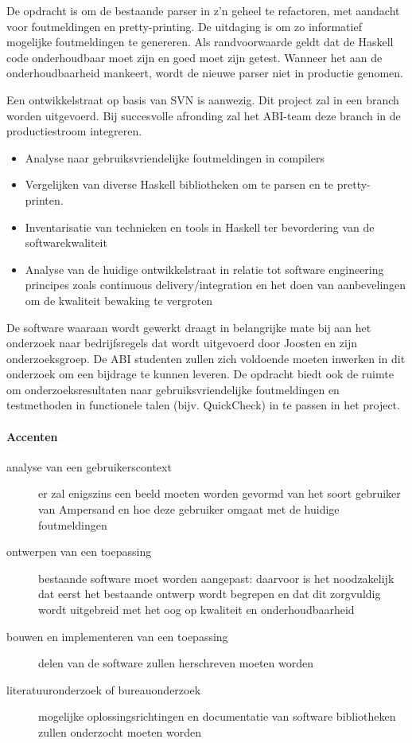 \documentclass[a4paper,12pt,abstracton,titlepage]{scrartcl}
\begin{document}
De opdracht is om de bestaande parser in z’n geheel te refactoren, met aandacht voor foutmeldingen en pretty-printing. De uitdaging is om zo informatief mogelijke foutmeldingen te genereren. Als randvoorwaarde geldt dat de Haskell code onderhoudbaar moet zijn en goed moet zijn getest. Wanneer het aan de onderhoudbaarheid mankeert, wordt de nieuwe parser niet in productie genomen.

Een ontwikkelstraat op basis van SVN is aanwezig. Dit project zal in een branch worden uitgevoerd. Bij succesvolle afronding zal het ABI-team deze branch in de productiestroom integreren.

\begin{itemize}
\item Analyse naar gebruiksvriendelijke foutmeldingen in compilers 
\item Vergelijken van diverse Haskell bibliotheken om te parsen en te pretty-printen. 
\item Inventarisatie van technieken en tools in Haskell ter bevordering van de software\-kwaliteit 
\item Analyse van de huidige ontwikkelstraat in relatie tot software engineering principes zoals continuous delivery/integration en het doen van aanbevelingen om de kwaliteit bewaking te vergroten 
\end{itemize}

De software waaraan wordt gewerkt draagt in belangrijke mate bij aan het onderzoek naar bedrijfsregels dat wordt uitgevoerd door Joosten en zijn onderzoeksgroep. De ABI studenten zullen zich voldoende moeten inwerken in dit onderzoek om een bijdrage te kunnen leveren. De opdracht biedt ook de ruimte om onderzoeksresultaten naar gebruiksvriendelijke foutmeldingen en testmethoden in functionele talen (bijv. QuickCheck) in te passen in het project.

\paragraph{Accenten}
\begin{description}
\item[analyse van een gebruikerscontext] er zal enigszins een beeld moeten worden gevormd van het soort gebruiker van Ampersand en hoe deze gebruiker omgaat met de huidige foutmeldingen
\item[ontwerpen van een toepassing] bestaande software moet worden aangepast: daarvoor is het noodzakelijk dat eerst het bestaande ontwerp wordt begrepen en dat dit zorgvuldig wordt uitgebreid met het oog op kwaliteit en onderhoudbaarheid
\item[bouwen en implementeren van een toepassing] delen van de software zullen herschreven moeten worden
\item[literatuuronderzoek of bureauonderzoek] mogelijke oplossingsrichtingen en documentatie van software bibliotheken zullen onderzocht moeten worden
\end{description}
\end{document}
